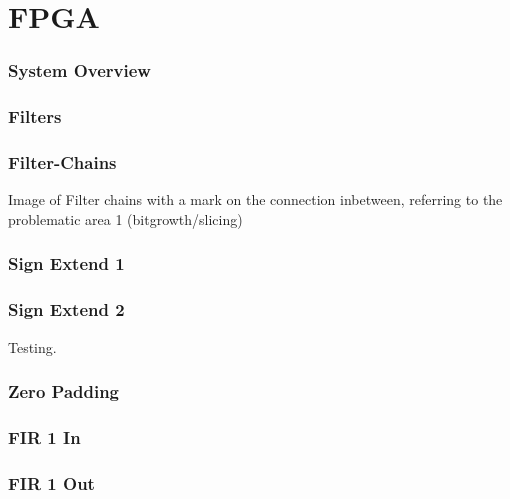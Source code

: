 \section{FPGA}

\begin{frame}
    \frametitle{System Overview}

    \centering
    
    
\end{frame}

\begin{frame}
    \frametitle{Filters}

    \centering
    
    
\end{frame}

\begin{frame}
    \frametitle{Filter-Chains}

    \centering
    Image of Filter chains with a mark on the connection inbetween, referring to the problematic area 1 (bitgrowth/slicing)
    
\end{frame}


\begin{frame}
    \frametitle<1>{Sign Extend 1}
    \frametitle<2>{Sign Extend 2}

    \begin{overprint}
        Testing.

        
    \end{overprint}

    \centering
    
\end{frame}

\begin{frame}
    \frametitle{Zero Padding}

    \centering
    
    
\end{frame}

\begin{frame}
    \frametitle{FIR 1 In}

    \centering
    
    
\end{frame}

\begin{frame}
    \frametitle{FIR 1 Out}

    \centering
    
    
\end{frame}

